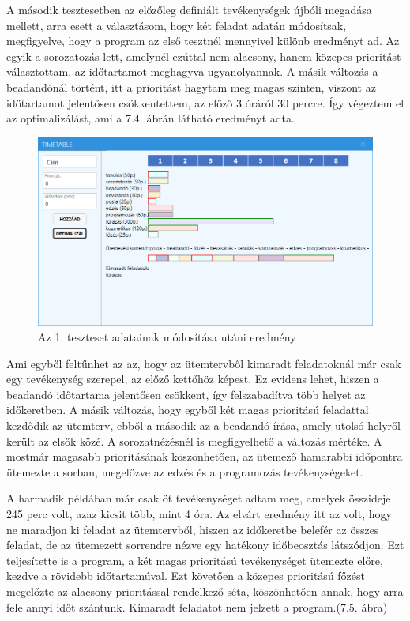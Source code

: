 
A második tesztesetben az előzőleg definiált tevékenységek újbóli megadása mellett, arra esett a választásom, hogy két feladat adatán módosítsak, megfigyelve, hogy a program az első tesztnél mennyivel különb eredményt ad. Az egyik a sorozatozás lett, amelynél ezúttal nem alacsony, hanem közepes prioritást választottam, az időtartamot meghagyva ugyanolyannak. A másik változás a beadandónál történt, itt a prioritást hagytam meg magas szinten, viszont az időtartamot jelentősen csökkentettem, az előző 3 óráról 30 percre. Így végeztem el az optimalizálást, ami a 7.4. ábrán látható eredményt adta.

\begin{figure}[h]
	\centering
	\includegraphics[scale=0.6]{images/test/result1.2.png}
	\caption{Az 1. teszteset adatainak módosítása utáni eredmény}
\end{figure}

Ami egyből feltűnhet az az, hogy az ütemtervből kimaradt feladatoknál már csak egy tevékenység szerepel, az előző kettőhöz képest. Ez evidens lehet, hiszen a beadandó időtartama jelentősen csökkent, így felszabadítva több helyet az időkeretben. A másik változás, hogy egyből két magas prioritású feladattal kezdődik az ütemterv, ebből a második az a beadandó írása, amely utolsó helyről került az elsők közé. A sorozatnézésnél is megfigyelhető a változás mértéke. A mostmár magasabb prioritásának köszönhetően, az ütemező hamarabbi időpontra ütemezte a sorban, megelőzve az edzés és a programozás tevékenységeket.


A harmadik példában már csak öt tevékenységet adtam meg, amelyek összideje 245 perc volt, azaz kicsit több, mint 4 óra. Az elvárt eredmény itt az volt, hogy ne maradjon ki feladat az ütemtervből, hiszen az időkeretbe belefér az összes feladat, de az ütemezett sorrendre nézve egy hatékony időbeosztás látszódjon. Ezt teljesítette is a program, a két magas prioritású tevékenységet ütemezte előre, kezdve a rövidebb időtartamúval. Ezt követően a közepes prioritású főzést megelőzte az alacsony prioritással rendelkező séta, köszönhetően annak, hogy arra fele annyi időt szántunk. Kimaradt feladatot nem jelzett a program.(7.5. ábra)


